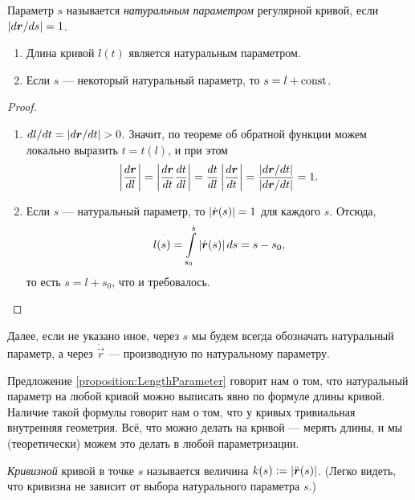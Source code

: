 \begin{definition}
	Параметр $s$ называется \textit{натуральным параметром} регулярной кривой, если $\left\lvert d\boldsymbol{r} / ds\right\rvert = 1$.
\end{definition}

\begin{proposition} \label{proposition:LengthParameter}
	\begin{enumerate}[nolistsep, label=(\arabic*)]
		\item Длина кривой $l(t)$ является натуральным параметром.
		\item Если $s$ --- некоторый натуральный параметр, то $s = l + \mathrm{const}$.
	\end{enumerate}
\end{proposition}

\begin{proof}
	\begin{enumerate}[nolistsep, label=(\arabic*)]
		\item $dl / dt = \left\lvert d\boldsymbol{r} / dt\right\rvert > 0$. Значит, по теореме об обратной функции можем локально выразить $t = t(l)$, и при этом
			\[
				\left\lvert\frac{d\boldsymbol{r}}{dl}\right\rvert = \left\lvert\frac{d\boldsymbol{r}}{dt}\frac{dt}{dl}\right\rvert = \frac{dt}{dl}\left\lvert\frac{d\boldsymbol{r}}{dt}\right\rvert = \frac{\left\lvert d\boldsymbol{r} / dt\right\rvert}{\left\lvert d\boldsymbol{r} / dt\right\rvert} = 1.
			\]
		\item Если $s$ --- натуральный параметр, то $\left\lvert\dot{\boldsymbol{r}}(s)\right\rvert = 1$ для каждого $s$. Отсюда,
			\[
				l(s) = \int\limits_{s_0}^s\left\lvert\dot{\boldsymbol{r}}(s)\right\rvert ds = s - s_0,
			\]
			то есть $s = l + s_0$, что и требовалось.
	\end{enumerate}
\end{proof}

Далее, если не указано иное, через $s$ мы будем всегда обозначать натуральный параметр, а через $\dot{\vec{r}}$ --- производную по натуральному параметру.

Предложение \ref{proposition:LengthParameter} говорит нам о том, что натуральный параметр на любой кривой можно выписать явно по формуле длины кривой. Наличие такой формулы говорит нам о том, что у кривых тривиальная внутренняя геометрия. Всё, что можно делать на кривой --- мерять длины, и мы (теоретически) можем это делать в любой параметризации.

\begin{definition}
	\textit{Кривизной} кривой в точке $s$ называется величина $k(s) \vcentcolon = \left\lvert\ddot{\boldsymbol{r}}(s)\right\rvert$. (Легко видеть, что кривизна не зависит от выбора натурального параметра $s$.)
\end{definition}

